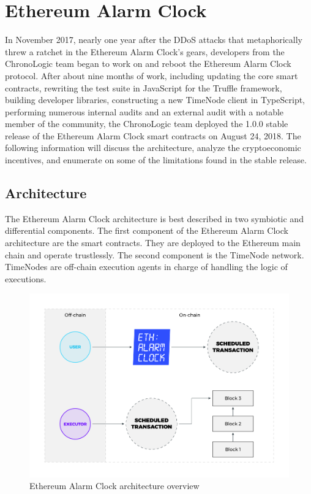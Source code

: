 \documentclass{report}
\begin{document}
  \chapter{Ethereum Alarm Clock}
  In November 2017, nearly one year after the DDoS attacks that metaphorically threw a ratchet in the Ethereum Alarm Clock’s gears, developers from the ChronoLogic team began to work on and reboot the Ethereum Alarm Clock protocol. After about nine months of work, including updating the core smart contracts, rewriting the test suite in JavaScript for the Truffle framework, building developer libraries, constructing a new TimeNode client in TypeScript, performing numerous internal audits and an external audit with a notable member of the community, the ChronoLogic team deployed the 1.0.0 stable release of the Ethereum Alarm Clock smart contracts on August 24, 2018. The following information will discuss the architecture, analyze the cryptoeconomic incentives, and enumerate on some of the limitations found in the stable release.
  \section{Architecture}
  The Ethereum Alarm Clock architecture is best described in two symbiotic and differential components. The first component of the Ethereum Alarm Clock architecture are the smart contracts. They are deployed to the Ethereum main chain and operate trustlessly. The second component is the TimeNode network. TimeNodes are off-chain execution agents in charge of handling the logic of executions.
  \begin{figure}[h]
  \includegraphics[width=\textwidth]{diagram6}
  \caption{Ethereum Alarm Clock architecture overview}
  \end{figure}
\end{document}
